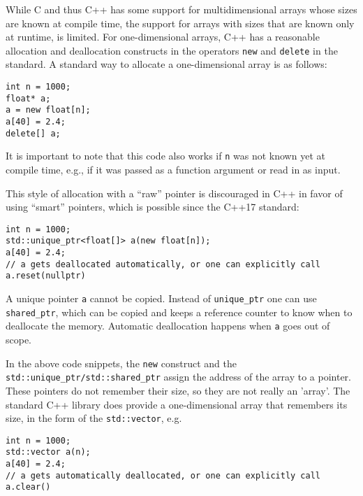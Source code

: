 \documentclass[11pt,twoside]{article}
\begin{document}
While C and thus C++ has some support for multidimensional arrays
whose sizes are known at compile time, the support for arrays with
sizes that are known only at runtime, is limited. For one-dimensional
arrays,  C++ has a reasonable allocation and deallocation constructs in the operators
\texttt{new} and \texttt{delete} in the standard.  A standard way to allocate a
one-dimensional array is as follows:
\vspace{-5pt}\begin{framed}\vspace{-14pt}%
\begin{verbatim}
int n = 1000;
float* a;
a = new float[n];
a[40] = 2.4;
delete[] a;
\end{verbatim}%
\vspace{-12pt}\end{framed}\vspace{-5pt}\noindent%
It is important to note that this code also works if \texttt{n} was
not known yet at compile time, e.g., if it was passed as a function
argument or read in as input.

This style of allocation with a
``raw'' pointer is discouraged in C++ in favor of using ``smart''
pointers, which is possible since the C++17 standard:
\vspace{-5pt}\begin{framed}\vspace{-14pt}%
\begin{verbatim}
int n = 1000;
std::unique_ptr<float[]> a(new float[n]); 
a[40] = 2.4;
// a gets deallocated automatically, or one can explicitly call a.reset(nullptr)
\end{verbatim}%
\vspace{-12pt}\end{framed}\vspace{-5pt}\noindent%
A unique pointer \texttt{a} cannot be copied.  Instead of
\texttt{unique\_ptr} one can use \texttt{shared\_ptr}, which can be
copied and keeps a reference counter to know when to deallocate the
memory.  Automatic deallocation happens when \texttt{a} goes out of scope.

In the above code snippets, the \texttt{new} construct and the
\texttt{std::unique\_ptr/std::shared\_ptr} assign the address of the
array to a pointer. These pointers do not remember their size, so they are not really an 'array'.  The standard C++ library does provide a one-dimensional array that remembers its size, in the form of the \texttt{std::vector}, e.g.
\vspace{-5pt}\begin{framed}\vspace{-14pt}%
\begin{verbatim}
int n = 1000;
std::vector a(n);
a[40] = 2.4;
// a gets automatically deallocated, or one can explicitly call a.clear()
\end{verbatim}%
\vspace{-12pt}\end{framed}\vspace{-5pt}%
\end{document}
